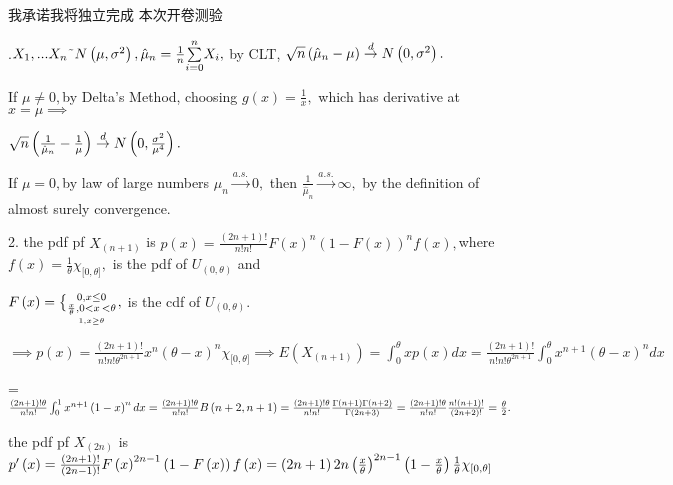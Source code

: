 \documentclass{ctexart}
\def\QATOPD#1#2#3#4{{#3 \atopwithdelims#1#2 #4}}%
\begin{document}
我承诺我将独立完成%
本次开卷测验

.$X_{1},...X_{n}\symbol{126}N\left( \mu ,\sigma ^{2}\right) ,\hat{%
\mu}_{n}=\frac{1}{n}\underset{i=0}{\overset{n}{\sum }}X_{i},$ by CLT, $\sqrt{%
n}\left( \hat{\mu}_{n}-\mu \right) \overset{d}{\rightarrow }N\left( 0,\sigma
^{2}\right) .$

If $\mu \neq 0,$by Delta's Method, choosing $g\left( x\right) =\frac{1}{x},$%
which has derivative at $x=\mu \implies $

$\sqrt{n}\left( \frac{1}{\hat{\mu}_{n}}-\frac{1}{\mu }\right) \overset{d}{%
\rightarrow }N\left( 0,\frac{\sigma ^{2}}{\mu ^{4}}\right) .$

If $\mu =0,$by law of large numbers $\hat{\mu}_{n}\overset{a.s.}{\rightarrow 
}0,$ then $\frac{1}{\hat{\mu}_{n}}\overset{a.s.}{\rightarrow }\infty ,$ by
the definition of almost surely convergence.

2. the pdf pf $X_{\left( n+1\right) }$ is $p\left( x\right) =\frac{\left(
2n+1\right) !}{n!n!}F\left( x\right) ^{n}\left( 1-F\left( x\right) \right)
^{n}f\left( x\right) ,$where $f\left( x\right) =\frac{1}{\theta }\chi
_{\lbrack 0,\theta ]},$ is the pdf of $U_{\left( 0,\theta \right) }$ and

$F\left( x\right) =\QATOPD\{ . {0,x\leq 0}{\underset{1,x\geq \theta }{\frac{x%
}{\theta },0<x\,<\theta }},$ is the cdf of $U_{\left( 0,\theta \right) }.$

$\implies p\left( x\right) =\frac{\left( 2n+1\right) !}{n!n!\theta ^{2n+1}}%
x^{n}\left( \theta -x\right) ^{n}\chi _{\lbrack 0,\theta ]}\implies E\left(
X_{\left( n+1\right) }\right) =\int_{0}^{\theta }xp(x)dx=\frac{\left(
2n+1\right) !}{n!n!\theta ^{2n+1}}\int_{0}^{\theta }x^{n+1}\left( \theta
-x\right) ^{n}dx$

=$\frac{\left( 2n+1\right) !\theta }{n!n!}\int_{0}^{1}x^{n+1}\left(
1-x\right) ^{n}dx=\frac{\left( 2n+1\right) !\theta }{n!n!}B\left(
n+2,n+1\right) =\frac{\left( 2n+1\right) !\theta }{n!n!}\frac{\Gamma \left(
n+1\right) \Gamma \left( n+2\right) }{\Gamma \left( 2n+3\right) }=\frac{%
\left( 2n+1\right) !\theta }{n!n!}\frac{n!\left( n+1\right) !}{\left(
2n+2\right) !}=\frac{\theta }{2}.$

the pdf pf $X_{\left( 2n\right) }$ is $p^{\prime }\left( x\right) =\frac{%
\left( 2n+1\right) !}{\left( 2n-1\right) !}F\left( x\right) ^{2n-1}\left(
1-F\left( x\right) \right) f\left( x\right) =\left( 2n+1\right) 2n\left( 
\frac{x}{\theta }\right) ^{2n-1}\left( 1-\frac{x}{\theta }\right) \frac{1}{%
\theta }\chi _{\lbrack 0,\theta ]}$
\end{document}
